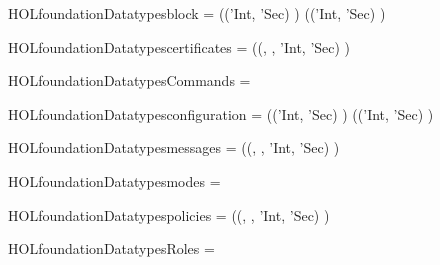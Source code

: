 \newcommand{\HOLfoundationDate}{20 August 2016}
\newcommand{\HOLfoundationTime}{12:50}
\begin{SaveVerbatim}{HOLfoundationDatatypesblock}
 =  (('Int, 'Sec) ) (('Int, 'Sec) )
\end{SaveVerbatim}
\newcommand{\HOLfoundationDatatypesblock}{\UseVerbatim{HOLfoundationDatatypesblock}}
\begin{SaveVerbatim}{HOLfoundationDatatypescertificates}
 =  ((, , 'Int, 'Sec)  )
\end{SaveVerbatim}
\newcommand{\HOLfoundationDatatypescertificates}{\UseVerbatim{HOLfoundationDatatypescertificates}}
\begin{SaveVerbatim}{HOLfoundationDatatypesCommands}
 =  \HOLTokenBar{} 
\end{SaveVerbatim}
\newcommand{\HOLfoundationDatatypesCommands}{\UseVerbatim{HOLfoundationDatatypesCommands}}
\begin{SaveVerbatim}{HOLfoundationDatatypesconfiguration}
 =
      (('Int, 'Sec) )
        (('Int, 'Sec) )
\end{SaveVerbatim}
\newcommand{\HOLfoundationDatatypesconfiguration}{\UseVerbatim{HOLfoundationDatatypesconfiguration}}
\begin{SaveVerbatim}{HOLfoundationDatatypesmessages}
 =  ((, , 'Int, 'Sec)  )
\end{SaveVerbatim}
\newcommand{\HOLfoundationDatatypesmessages}{\UseVerbatim{HOLfoundationDatatypesmessages}}
\begin{SaveVerbatim}{HOLfoundationDatatypesmodes}
 =  \HOLTokenBar{} 
\end{SaveVerbatim}
\newcommand{\HOLfoundationDatatypesmodes}{\UseVerbatim{HOLfoundationDatatypesmodes}}
\begin{SaveVerbatim}{HOLfoundationDatatypespolicies}
 =  ((, , 'Int, 'Sec)  )
\end{SaveVerbatim}
\newcommand{\HOLfoundationDatatypespolicies}{\UseVerbatim{HOLfoundationDatatypespolicies}}
\begin{SaveVerbatim}{HOLfoundationDatatypesRoles}
 = 
\end{SaveVerbatim}
